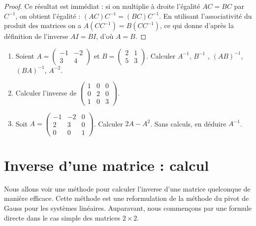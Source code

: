 \documentclass[class=report,crop=false]{standalone}
\begin{document}
\begin{proof}
Ce résultat est immédiat : si on multiplie à droite l'égalité
$AC=BC$ par $C^{-1}$, on obtient l'égalité :
$(AC)C^{-1}=(BC)C^{-1}$. En utilisant l'associativité
du produit des matrices on a $A(CC^{-1})=B(CC^{-1})$,
ce qui donne d'après la définition de l'inverse $AI=BI$, d'où
$A=B$.
\end{proof}


\begin{miniexercices}
\sauteligne
\begin{enumerate}
  \item Soient $A=\left(\begin{smallmatrix}-1 & -2 \\ 3  & 4 \end{smallmatrix}\right)$
  et $B = \left(\begin{smallmatrix}2 & 1 \\ 5  & 3 \end{smallmatrix}\right)$. Calculer
  $A^{-1}$, $B^{-1}$ , $(AB)^{-1}$, $(BA)^{-1}$, $A^{-2}$.

  \item Calculer l'inverse de $\left(\begin{smallmatrix}1&0&0\\0&2&0\\1&0&3\end{smallmatrix}\right)$.

  \item Soit $A=\left(\begin{smallmatrix}-1&-2&0\\2&3&0\\0&0&1\end{smallmatrix}\right)$.
  Calculer $2A-A^2$. Sans calculs, en déduire $A^{-1}$.
\end{enumerate}
\end{miniexercices}

\section{Inverse d'une matrice : calcul}

Nous allons voir une méthode pour calculer l'inverse d'une matrice quelconque de manière efficace.
Cette méthode est une reformulation de la méthode du pivot de Gauss pour les systèmes linéaires.
Auparavant, nous commençons par une formule directe dans le cas simple des matrices $2\times 2$.
\end{document}
